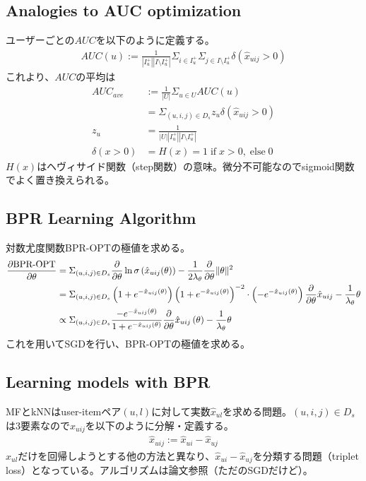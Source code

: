\documentclass[onecolumn,10pt]{article}
\begin{document}
\subsection{Analogies to AUC optimization}
ユーザーごとの$AUC$を以下のように定義する。
\begin{align}
	AUC(u) := \frac{1}{| I_u^+ || I \setminus I_u^+ |} \Sigma_{i \in I_u^+}\Sigma_{j \in I \setminus I_u^+} \delta (\hat x_{uij} > 0)
\end{align}
これより、$AUC$の平均は
\begin{align}
	AUC_{ave} &:= \frac{1}{|U|} \Sigma_{u \in U} AUC(u) \\
	&= \Sigma_{(u,i,j) \in D_s} z_u \delta (\hat x_{uij} > 0) \\
	z_u &= \frac{1}{|U| | I_u^+ | |I \setminus I_u^+ |} \\
	\delta (x > 0) &= H(x) = 1\;\mathrm{if}\; x>0, \; \mathrm{else}\; 0
\end{align}
$H(x)$はヘヴィサイド関数（step関数）の意味。微分不可能なのでsigmoid関数でよく置き換えられる。

\subsection{BPR Learning Algorithm}
対数尤度関数BPR-OPTの極値を求める。
\begin{align}
	\frac{\partial \mathrm{BPR\mathchar`-OPT}}{\partial \theta} &= \Sigma_{(u,i,j) \in D_s} \frac{\partial}{\partial \theta} \ln \sigma \left(\hat x_{uij} (\theta ) \right) - \frac{1}{2\lambda_{\theta}}\frac{\partial}{\partial \theta}\|\theta\|^2 \\
	&= \Sigma_{(u,i,j) \in D_s} \left(1+e^{- \hat x_{uij}(\theta)} \right)\left(1+e^{- \hat x_{uij}(\theta)} \right)^{-2} \cdot \left(-e^{- \hat x_{uij}(\theta)} \right) \frac{\partial}{\partial \theta} \hat x_{uij} - \frac{1}{\lambda_{\theta}} \theta \\
	&\propto \Sigma_{(u,i,j) \in D_s} \frac{-e^{- \hat x_{uij}(\theta)}}{1+e^{- \hat x_{uij}(\theta)}}\frac{\partial}{\partial \theta} \hat x_{uij} \left(\theta \right) - \frac{1}{\lambda_{\theta}}\theta
\end{align}
これを用いてSGDを行い、BPR-OPTの極値を求める。

\subsection{Learning models with BPR}
MFとkNNはuser-itemペア$(u,l)$に対して実数$\hat x_{ul}$を求める問題。$(u,i,j) \in D_s$は3要素なので$\hat x_{uij}$を以下のように分解・定義する。
\begin{align}
	\hat x_{uij} := \hat x_{ui} - \hat x_{uj}
\end{align}
$\hat x_{ul}$だけを回帰しようとする他の方法と異なり、$\hat x_{ui} - \hat x_{uj}$を分類する問題（triplet loss）となっている。アルゴリズムは論文参照（ただのSGDだけど）。
\end{document}
